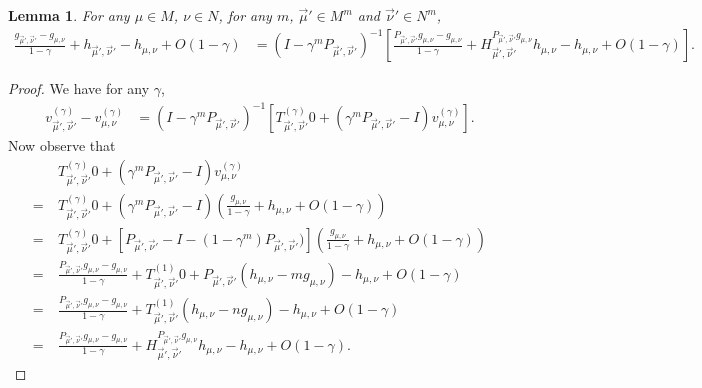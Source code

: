 \documentclass{article}
\newtheorem{lemma}{Lemma}
\begin{document}
\begin{lemma}
  For any $\mu \in M$, $\nu \in N$, for any $m$, $\vec\mu' \in M^m$ and $\vec\nu' \in N^m$,
  \begin{align}
\frac{g_{\vec\mu',\vec\nu'} - g_{\mu,\nu}}{1-\gamma} + h_{\vec\mu',\vec\nu'} - h_{\mu,\nu} + O(1-\gamma) & = (I-\gamma^m P_{\vec\mu',\vec\nu'})^{-1} \left[ \frac{P_{\vec\mu',\vec\nu'}g_{\mu,\nu}-g_{\mu,\nu}}{1-\gamma} + H^{P_{\vec\mu',\vec\nu'}g_{\mu,\nu}}_{\vec\mu',\vec\nu'} h_{\mu,\nu}-h_{\mu,\nu} + O(1-\gamma) \right].
  \end{align}
\end{lemma}
\begin{proof}
We have for any $\gamma$,
\begin{align}
 v^{(\gamma)}_{\vec\mu',\vec\nu'} - v^{(\gamma)}_{\mu,\nu}    &= (I-\gamma^m P_{\vec\mu',\vec\nu'})^{-1}[ T^{(\gamma)}_{\vec\mu',\vec\nu'}0 + (\gamma^m P_{\vec\mu',\vec\nu'}-I)v^{(\gamma)}_{\mu,\nu} ].
\end{align}
Now observe that
\begin{align}
  & T^{(\gamma)}_{\vec\mu',\vec\nu'}0 + (\gamma^m P_{\vec\mu',\vec\nu'}-I)v^{(\gamma)}_{\mu,\nu} \\
    =~& T^{(\gamma)}_{\vec\mu',\vec\nu'}0 + (\gamma^m P_{\vec\mu',\vec\nu'}-I)\left( \frac{g_{\mu,\nu}}{1-\gamma} + h_{\mu,\nu} + O(1-\gamma) \right) \\
  =~ & T^{(\gamma)}_{\vec\mu',\vec\nu'}0 + [P_{\vec\mu',\vec\nu'}-I-(1-\gamma^m)P_{\vec\mu',\vec\nu'})] \left( \frac{g_{\mu,\nu}}{1-\gamma} + h_{\mu,\nu} + O(1-\gamma) \right) \\
  =~ & \frac{P_{\vec\mu',\vec\nu'}g_{\mu,\nu}-g_{\mu,\nu}}{1-\gamma} + T^{(1)}_{\vec\mu',\vec\nu'}0  + P_{\vec\mu',\vec\nu'}(h_{\mu,\nu}- m g_{\mu,\nu}) -h_{\mu,\nu} + O(1-\gamma) \\
  =~ & \frac{P_{\vec\mu',\vec\nu'}g_{\mu,\nu}-g_{\mu,\nu}}{1-\gamma} + T^{(1)}_{\vec\mu',\vec\nu'}(h_{\mu,\nu}-n g_{\mu,\nu}) -h_{\mu,\nu} + O(1-\gamma) \\
  =~ & \frac{P_{\vec\mu',\vec\nu'}g_{\mu,\nu}-g_{\mu,\nu}}{1-\gamma} + H^{P_{\vec\mu',\vec\nu'}g_{\mu,\nu}}_{\vec\mu',\vec\nu'} h_{\mu,\nu}-h_{\mu,\nu} + O(1-\gamma).
\end{align}
\end{proof}
\end{document}
